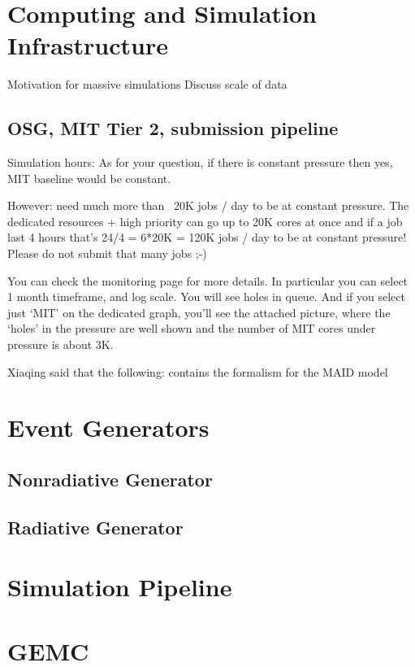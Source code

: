 \section{Computing and Simulation Infrastructure}\label{sec:ch3gemc}
    Motivation for massive simulations
    Discuss scale of data
    \subsection{OSG, MIT Tier 2, submission pipeline}

    Simulation hours: 
    As for your question, if there is constant pressure then yes, MIT baseline would be constant.

However: need much more than ~20K jobs / day to be at constant pressure. The dedicated resources + high priority can go up to 20K cores at once and if a job last 4 hours that’s 24/4 = 6*20K = 120K jobs / day to be at constant pressure! Please do not submit that many jobs ;-)

You can check the monitoring page for more details. In particular you can select 1 month timeframe, and log scale. You will see holes in queue.
And if you select just ‘MIT’ on the dedicated graph, you’ll see the attached picture, where the ‘holes’ in the pressure are well shown and the number of MIT cores under pressure is about 3K.

Xiaqing said that the following: \cite{Dreschsel1992ThresholdNucleons} contains the formalism for the MAID model



\section{Event Generators}\label{sec:ch3generator}
    \subsection{Nonradiative Generator}
    \subsection{Radiative Generator}


\section{Simulation Pipeline}
    \section{GEMC}


